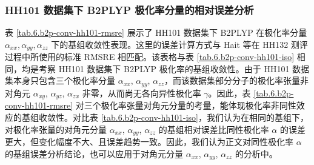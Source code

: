 \subsubsection{HH101 数据集下 B2PLYP 极化率分量的相对误差分析}

表 \ref{tab.6.b2p-conv-hh101-rmsre} 展示了 HH101 数据集下 B2PLYP 在极化率分量 $\alpha_{xx}, \alpha_{yy}, \alpha_{zz}$ 下的基组收敛性表现。这里的误差计算方式与 Hait 等\cite{Hait-Head-Gordon.PCCP.2018}在 HH132 测评过程中所使用的标准 RMSRE 相匹配。该表格与表 \ref{tab.6.b2p-conv-hh101-iso} 相同，均是考察 HH101 数据集下 B2PLYP 极化率的基组收敛性。由于 HH101 数据集本身只包含三个极化率分量 $\alpha_{xx}$, $\alpha_{yy}$, $\alpha_{zz}$，而该数据集部分分子的极化率张量非对角元 $\alpha_{xy}$, $\alpha_{yz}$, $\alpha_{zx}$ 非零，从而尚无各向异性极化率 $\gamma$。因此，表 \ref{tab.6.b2p-conv-hh101-rmsre} 对三个极化率张量对角元分量的考量，能体现极化率非同性效应的基组收敛性。对比表 \ref{tab.6.b2p-conv-hh101-iso}，我们认为在相同的基组下，对极化率张量的对角元分量 $\alpha_{xx}$, $\alpha_{yy}$, $\alpha_{zz}$ 的基组相对误差比同性极化率 $\alpha$ 的误差更大，但变化幅度不大、且误差趋势一致。因此，我们认为正文对同性极化率 $\alpha$ 的基组误差分析结论，也可以应用于对角元分量 $\alpha_{xx}$, $\alpha_{yy}$, $\alpha_{zz}$ 的分析中。

